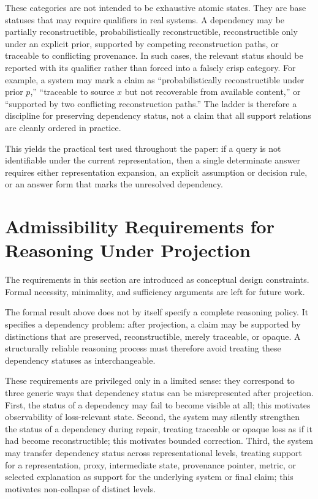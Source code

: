 \documentclass[11pt]{article}
\begin{document}
These categories are not intended to be exhaustive atomic states. They are base statuses that may require qualifiers in real systems. A dependency may be partially reconstructible, probabilistically reconstructible, reconstructible only under an explicit prior, supported by competing reconstruction paths, or traceable to conflicting provenance. In such cases, the relevant status should be reported with its qualifier rather than forced into a falsely crisp category. For example, a system may mark a claim as ``probabilistically reconstructible under prior $p$,'' ``traceable to source $x$ but not recoverable from available content,'' or ``supported by two conflicting reconstruction paths.'' The ladder is therefore a discipline for preserving dependency status, not a claim that all support relations are cleanly ordered in practice.

This yields the practical test used throughout the paper: if a query is not identifiable under the current representation, then a single determinate answer requires either representation expansion, an explicit assumption or decision rule, or an answer form that marks the unresolved dependency.

\section{Admissibility Requirements for Reasoning Under Projection}

The requirements in this section are introduced as conceptual design constraints. Formal necessity, minimality, and sufficiency arguments are left for future work.

The formal result above does not by itself specify a complete reasoning policy. It specifies a dependency problem: after projection, a claim may be supported by distinctions that are preserved, reconstructible, merely traceable, or opaque. A structurally reliable reasoning process must therefore avoid treating these dependency statuses as interchangeable.

These requirements are privileged only in a limited sense: they correspond to three generic ways that dependency status can be misrepresented after projection. First, the status of a dependency may fail to become visible at all; this motivates observability of loss-relevant state. Second, the system may silently strengthen the status of a dependency during repair, treating traceable or opaque loss as if it had become reconstructible; this motivates bounded correction. Third, the system may transfer dependency status across representational levels, treating support for a representation, proxy, intermediate state, provenance pointer, metric, or selected explanation as support for the underlying system or final claim; this motivates non-collapse of distinct levels.
\end{document}
